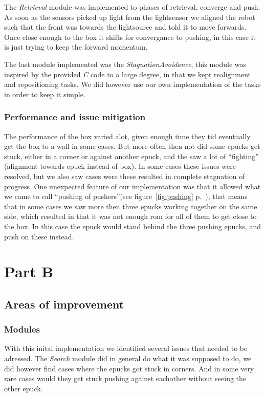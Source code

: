 \documentclass[12pt]{article}
\newcommand{\shiftline}[0]{\hfill\newline\noindent}
\begin{document}
		\shiftline The \textit{Retrieval} module was implemented to phases of retrieval, converge and push. 
			As soon as the sensors picked up light from the lightsensor we aligned the robot such that the front was towards the lightsource and told it to move forwards. 
			Once close enough to the box it shifts for convergance to pushing, in this case it is just trying to keep the forward momentum.
	
		\shiftline The last module implemented was the \textit{StagnationAvoidance}, this module was inspired by the provided \textit{C} code to a large degree, 
		in that we kept realignment and repositioning tasks. 
		We did however use our own implementation of the tasks in order to keep it simple. 
			
		\subsubsection{Performance and issue mitigation}
			The performance of the box varied alot, given enough time they tid eventually get the box to a wall in some cases. But more often then not did some epucks get stuck, 
			either in a corner or against another epuck, and the saw a lot of ``fighting'' (alignment towards epuck instead of box). In some cases these issues were resolved, 
			but we also saw cases were these resulted in complete stagnation of progress. 
			One unexpected feature of our implementation was that it allowed what we came to call "`pushing of pushers"'(see figure~\ref{fig:pushing} p.~\pageref{fig:pushing}), that means that in some cases we saw more then three 
			epucks working together on the same side, which resulted in that it was not enough rom for all of them to get close to the box. In this case the epuck would stand behind
			the three pushing epucks, and push on these instead. 
				

\section{Part B}
	\subsection{Areas of improvement}
		\subsubsection{Modules}
			With this inital implementation we identified several issues that needed to be adressed. 
			The \textit{Search} module did in general do what it was supposed to do, we did however find cases where the epucks got stuck in corners. 
			And in some very rare cases would they get stuck pushing against eachother without seeing the other epuck.
		
\end{document}
